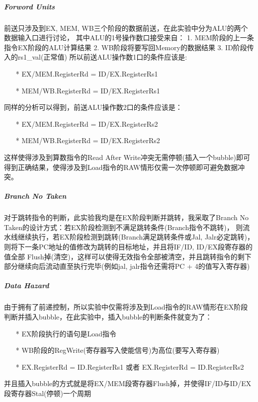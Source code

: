 \subparagraph{Forword Units}
前送只涉及到EX, MEM, WB三个阶段的数据前送，在此实验中分为ALU的两个数据输入口进行讨论，
其中ALU的1号操作数口接受来自：
1. MEM阶段的上一条指令EX阶段的ALU计算结果
2. WB阶段将要写回Memory的数据结果
3. ID阶段传入的rs1\_val(正常值)
所以前送ALU操作数1口的条件应该是:
\begin{itemize}
    \item [*] EX/MEM.RegisterRd = ID/EX.RegisterRs1
    \item [*] MEM/WB.RegisterRd = ID/EX.RegisterRs1
\end{itemize}
同样的分析可以得到，前送ALU操作数2口的条件应该是：
\begin{itemize}
    \item [*] EX/MEM.RegisterRd = ID/EX.RegisterRs2
    \item [*] MEM/WB.RegisterRd = ID/EX.RegisterRs2
\end{itemize}
这样使得涉及到算数指令的Read After Write冲突无需停顿(插入一个bubble)即可得到正确结果，使得涉及到Load指令的RAW情形仅需一次停顿即可避免数据冲突。

\subparagraph{Branch No Taken}
对于跳转指令的判断，此实验我均是在EX阶段判断并跳转，我采取了Branch No Taken的设计方式：若EX阶段检测到不满足跳转条件(Branch指令不跳转)，
则流水线继续执行，若EX阶段检测到跳转(Branch满足跳转条件或Jal, Jalr必定跳转)，则将下一条PC地址的值修改为跳转的目标地址，并且将IF/ID, ID/EX段寄存器的值全部
Flush掉(清空)，这样可以使得无效指令全部被清空，并且跳转指令的剩下部分继续向后流动直至执行完毕(例如jal, jalr指令还需将PC + 4的值写入寄存器)

\subparagraph{Data Hazard}
由于拥有了前递控制，所以实验中仅需将涉及到Load指令的RAW情形在EX阶段判断并插入bubble，在此实验中，插入bubble的判断条件就变为了：
\begin{itemize}
    \item [*] EX阶段执行的语句是Load指令
    \item [*] WB阶段的RegWrite(寄存器写入使能信号)为高位(要写入寄存器)
    \item [*] EX.RegisterRd = ID.RegisterRs1 或者 EX.RegisterRd = ID.RegisterRs2
\end{itemize}
并且插入bubble的方式就是将EX/MEM段寄存器Flush掉，并使得IF/ID与ID/EX段寄存器Stal(停顿)一个周期